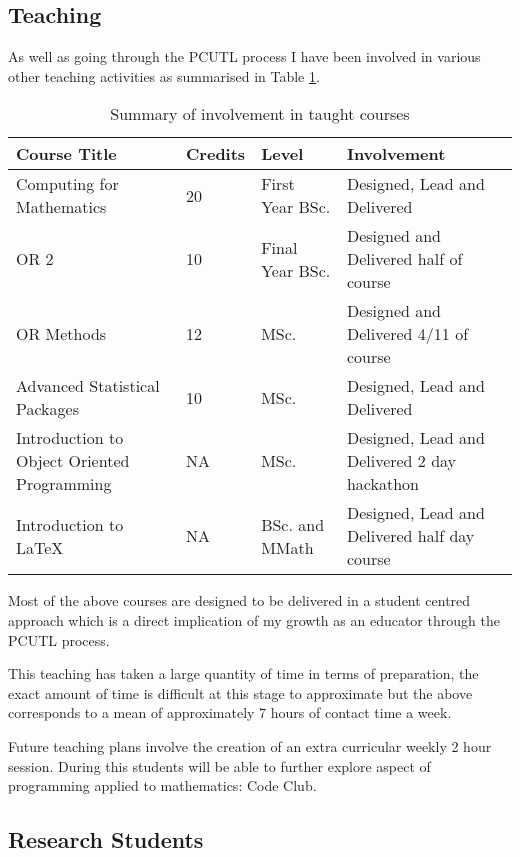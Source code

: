 \documentclass{article}
\begin{document}
\subsection{Teaching}

As well as going through the PCUTL process I have been involved in various other teaching activities as summarised in Table \ref{tab:teaching}.

\begin{table}[!htbp]
\begin{center}
\begin{tabular}{p{5cm}llp{6cm}}
\toprule
Course Title & Credits & Level & Involvement\\
\midrule
Computing for Mathematics & 20 &  First Year BSc. & Designed, Lead and Delivered\\
OR 2 & 10 &  Final Year BSc.  & Designed and Delivered half of course\\
OR Methods & 12 & MSc. & Designed and Delivered 4/11 of course\\
Advanced Statistical Packages & 10 &  MSc. & Designed, Lead and Delivered\\
Introduction to Object Oriented Programming & NA &  MSc. & Designed, Lead and Delivered 2 day hackathon\\
Introduction to \LaTeX & NA & BSc. and MMath & Designed, Lead and Delivered half day course\\
\bottomrule
\end{tabular}
\caption{Summary of involvement in taught courses}\label{tab:teaching}
\end{center}
\end{table}

Most of the above courses are designed to be delivered in a student centred approach which is a direct implication of my growth as an educator through the PCUTL process.

This teaching has taken a large quantity of time in terms of preparation, the exact amount of time is difficult at this stage to approximate but the above corresponds to a mean of approximately 7 hours of contact time a week.

Future teaching plans involve the creation of an extra curricular weekly 2 hour session.
During this students will be able to further explore aspect of programming applied to mathematics: Code Club.

\subsection{Research Students}
\end{document}
